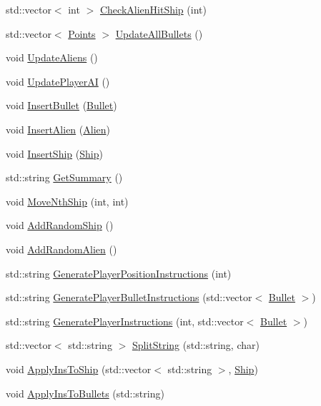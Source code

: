 \begin{DoxyCompactItemize}
std\-::vector$<$ int $>$ \hyperlink{classBoard_acea1951ab72b463854e33f9c934251ff}{Check\-Alien\-Hit\-Ship} (int)
\item 
std\-::vector$<$ \hyperlink{structPoints}{Points} $>$ \hyperlink{classBoard_ac5f4d61e766804fb6594190f291d2609}{Update\-All\-Bullets} ()
\item 
void \hyperlink{classBoard_adf79371ed66ad81dd8b9460aab8e6922}{Update\-Aliens} ()
\item 
void \hyperlink{classBoard_a55cc3abed148d96fe26d0f7c2c3c1455}{Update\-Player\-A\-I} ()
\item 
void \hyperlink{classBoard_ac01669380d6bbbfee220022159b590c5}{Insert\-Bullet} (\hyperlink{classBullet}{Bullet})
\item 
void \hyperlink{classBoard_a024eae78fe11e03519d5c0ef58d85db9}{Insert\-Alien} (\hyperlink{classAlien}{Alien})
\item 
void \hyperlink{classBoard_a7111111e66c4989f48e65eb81631a3ec}{Insert\-Ship} (\hyperlink{classShip}{Ship})
\item 
std\-::string \hyperlink{classBoard_aa3b61b2239e47ef8b15f6f9f0786b429}{Get\-Summary} ()
\item 
void \hyperlink{classBoard_afa34ba5e5fb7a536f3a7c7d0f4bfec49}{Move\-Nth\-Ship} (int, int)
\item 
void \hyperlink{classBoard_a3d99b005b1f99ccd1def4a702f45f244}{Add\-Random\-Ship} ()
\item 
void \hyperlink{classBoard_afcdb74fa821b0e6aa1218499175b2f15}{Add\-Random\-Alien} ()
\item 
std\-::string \hyperlink{classBoard_ad5828fd8bee3079d81f95612c0273617}{Generate\-Player\-Position\-Instructions} (int)
\item 
std\-::string \hyperlink{classBoard_a28c5886e943bfc4685dee86fead69178}{Generate\-Player\-Bullet\-Instructions} (std\-::vector$<$ \hyperlink{classBullet}{Bullet} $>$)
\item 
std\-::string \hyperlink{classBoard_a2d715bf1632a90386ec3ecd97b2a48d5}{Generate\-Player\-Instructions} (int, std\-::vector$<$ \hyperlink{classBullet}{Bullet} $>$)
\item 
std\-::vector$<$ std\-::string $>$ \hyperlink{classBoard_a5b2e6f9d556a63610685895d6f795ecb}{Split\-String} (std\-::string, char)
\item 
void \hyperlink{classBoard_acf3771b990df448feead07a91cd2d875}{Apply\-Ins\-To\-Ship} (std\-::vector$<$ std\-::string $>$, \hyperlink{classShip}{Ship})
\item 
void \hyperlink{classBoard_a23172bed8d2c37d924160bfa2f7ce5d6}{Apply\-Ins\-To\-Bullets} (std\-::string)

\end{DoxyCompactItemize}
